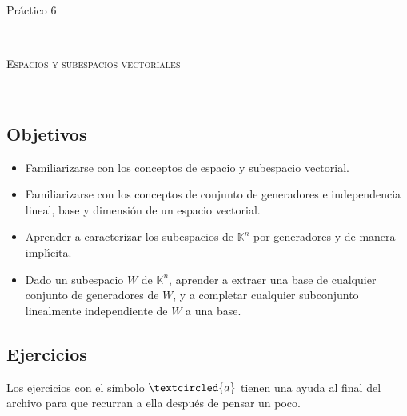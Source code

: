 \documentclass[12pt]{amsart}
\begin{document}
	
	
\centerline{\Large{Pr\' actico 6}}
	
\
	
\centerline{\textsc{Espacios y subespacios vectoriales}}
	
\
	
\subsection*{Objetivos}
	
\begin{itemize}
\item Familiarizarse con los conceptos de espacio y subespacio vectorial.
\item Familiarizarse con los conceptos de conjunto de generadores e independencia lineal, base y dimensi\' on de un espacio vectorial.
		
\item Aprender a caracterizar los subespacios de $\mathbb K^n$ por generadores y de manera impl\' \i cita.

\item Dado un subespacio $W$ de $\mathbb K^n$, aprender a extraer una base de cualquier conjunto de generadores de $W$, y a completar cualquier subconjunto linealmente independiente de $W$ a una base.

\end{itemize}
	
	
\subsection*{Ejercicios} Los ejercicios con el s\'imbolo $\textcircled{a}$ tienen una ayuda al final del archivo para que recurran a ella despu\'es de pensar un poco.
\end{document}
